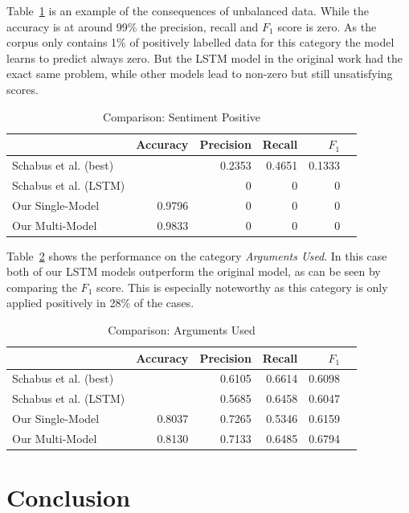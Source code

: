 \documentclass[11pt,a4paper]{article}
\begin{document}
Table~\ref{tab:results:sentiment_positive} is an example of the consequences of unbalanced data. While the accuracy is at around 99\% the precision, recall and $F_1$ score is zero. As the corpus only contains 1\% of positively labelled data for this category the model learns to predict always zero.
But the LSTM model in the original work had the exact same problem, while other models lead to non-zero but still unsatisfying scores.
\begin{table}[h!]
	\centering\scriptsize
	\begin{tabular}{l r r r r r}
		& Accuracy & Precision & Recall & $F_1$ \\
		\hline
		Schabus et al. (best) & & 0.2353 & 0.4651 & 0.1333 \\
		Schabus et al. (LSTM) & & 0 & 0 & 0\\
		\hline
		Our Single-Model & 0.9796 & 0 & 0 & 0 \\
		Our Multi-Model & 0.9833 & 0 & 0 & 0 \\
	\end{tabular}
	\caption{Comparison: Sentiment Positive}
	\label{tab:results:sentiment_positive}
\end{table}

Table~\ref{tab:results:arguments_used} shows the performance on the category \textit{Arguments Used}.
In this case both of our LSTM models outperform the original model, as can be seen by comparing the $F_1$ score.
This is especially noteworthy as this category is only applied positively in 28\% of the cases.  
\begin{table}[h!]
	\centering\scriptsize
	\begin{tabular}{l r r r r r}
		& Accuracy & Precision & Recall & $F_1$ \\
		\hline
		Schabus et al. (best) & & 0.6105 & 0.6614 & 0.6098 \\
		Schabus et al. (LSTM) & & 0.5685 & 0.6458 & 0.6047\\
		\hline
		Our Single-Model & 0.8037 & 0.7265 & 0.5346 & 0.6159 \\
		Our Multi-Model & 0.8130 & 0.7133 & 0.6485 & 0.6794 \\
	\end{tabular}
	\caption{Comparison: Arguments Used}
	\label{tab:results:arguments_used}
\end{table}


\section{Conclusion}
\end{document}
